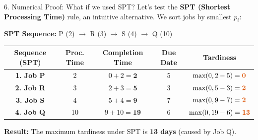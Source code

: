 \documentclass[12pt, aspectratio=169]{beamer}
\newcommand{\res}[1]{\textcolor{highlightcol}{\textbf{#1}}}
\begin{document}
\begin{frame}{6. Numerical Proof: What if we used SPT?}
    Let's test the \textbf{SPT (Shortest Processing Time)} rule, an intuitive alternative. We sort jobs by smallest $p_i$:
    
    \vspace{0.2cm}
    \textbf{SPT Sequence:} P (2) $\rightarrow$ R (3) $\rightarrow$ S (4) $\rightarrow$ Q (10)
    
    \vspace{0.2cm}
    \begin{center}
    \renewcommand{\arraystretch}{1.2}
    \small
    \begin{tabular}{c c c c c}
        \toprule
        \textbf{Sequence (SPT)} & \textbf{Proc. Time} & \textbf{Completion Time} & \textbf{Due Date} & \textbf{Tardiness} \tabularnewline
        \midrule
        \textbf{1. Job P} & 2 & $0 + 2 = \textbf{2}$ & 5 & $\max(0, 2 - 5) = \res{0}$ \tabularnewline
        \textbf{2. Job R} & 3 & $2 + 3 = \textbf{5}$ & 3 & $\max(0, 5 - 3) = \res{2}$ \tabularnewline
        \textbf{3. Job S} & 4 & $5 + 4 = \textbf{9}$ & 7 & $\max(0, 9 - 7) = \res{2}$ \tabularnewline
        \textbf{4. Job Q} & 10 & $9 + 10 = \textbf{19}$ & 6 & $\max(0, 19 - 6) = \res{13}$ \tabularnewline
        \bottomrule
    \end{tabular}
    \end{center}
    
    \vspace{0.2cm}
    \textbf{Result:} The maximum tardiness under SPT is \textbf{13 days} (caused by Job Q).
\end{frame}
\end{document}
